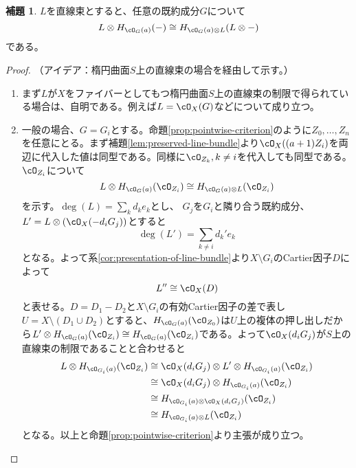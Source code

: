 \documentclass[uplatex, a4paper, dvipdfmx]{jsarticle}
\theoremstyle{definition}
\newtheorem{lemma}[theorem]{補題}
\begin{document}
\begin{lemma}\label{lem:conjugate-action-by-line-bundle}
    $L$を直線束とすると、任意の既約成分$G$について
    \begin{equation}
        L\otimes H_{\cO_G(a)}(-) \cong H_{\cO_G(a) \otimes L}(L\otimes -)
    \end{equation}
    である。
\end{lemma}
\begin{proof}
    （アイデア：楕円曲面$S$上の直線束の場合を経由して示す。）
    \begin{enumerate}
        \item まず$L$が$X$をファイバーとしてもつ楕円曲面$S$上の直線束の制限で得られている場合は、自明である。例えば$L = \cO_X(G)$などについて成り立つ。
        \item 一般の場合、$G = G_i$とする。命題\ref{prop:pointwise-criterion}のように$Z_0, \dots, Z_n$を任意にとる。まず補題\ref{lem:preserved-line-bundle}より$\cO_X((a+1)Z_i)$を両辺に代入した値は同型である。同様に$\cO_{Z_k}, k \neq i$を代入しても同型である。$\cO_{Z_i}$について
              \begin{equation}
                  L \otimes H_{\cO_G(a)}(\cO_{Z_i}) \cong H_{\cO_G(a) \otimes L}(\cO_{Z_i})
              \end{equation}
              を示す。$\deg(L) = \sum_{k}d_ke_k$とし、 $G_j$を$G_i$と隣り合う既約成分、$L' = L\otimes (\cO_X(-d_iG_j))$とすると
              \begin{equation}
                  \deg(L') = \sum_{k \neq i} d_k'e_k
              \end{equation}
              となる。よって系\ref{cor:presentation-of-line-bundle}より$X\setminus G_i$のCartier因子$D$によって\begin{equation}
                  L'' \cong \cO_X(D)
              \end{equation}
              と表せる。$D = D_1 - D_2$と$X \setminus G_i$の有効Cartier因子の差で表し$U = X \setminus (D_1 \cup D_2)$とすると、$H_{\cO_{G}(a)}(\cO_{Z_0})$は$U$上の複体の押し出しだから$L' \otimes H_{\cO_{G}(a)}(\cO_{Z_i}) \cong H_{\cO_{G}(a)}(\cO_{Z_i})$である。よって$\cO_X(d_iG_j)$が$S$上の直線束の制限であることと合わせると
              \begin{align}
                  L \otimes H_{\cO_{G_i}(a)}(\cO_{Z_i}) & \cong \cO_X(d_iG_j) \otimes L' \otimes H_{\cO_{G_i}(a)}(\cO_{Z_i}) \\
                                                        & \cong \cO_X(d_iG_j) \otimes H_{\cO_{G_i}(a)}(\cO_{Z_i})            \\
                                                        & \cong H_{\cO_{G_i}(a) \otimes \cO_X(d_iG_j)}(\cO_{Z_i})            \\
                                                        & \cong H_{\cO_{G_i}(a) \otimes L}(\cO_{Z_i})
              \end{align}
              となる。以上と命題\ref{prop:pointwise-criterion}より主張が成り立つ。
    \end{enumerate}
\end{proof}
\end{document}
